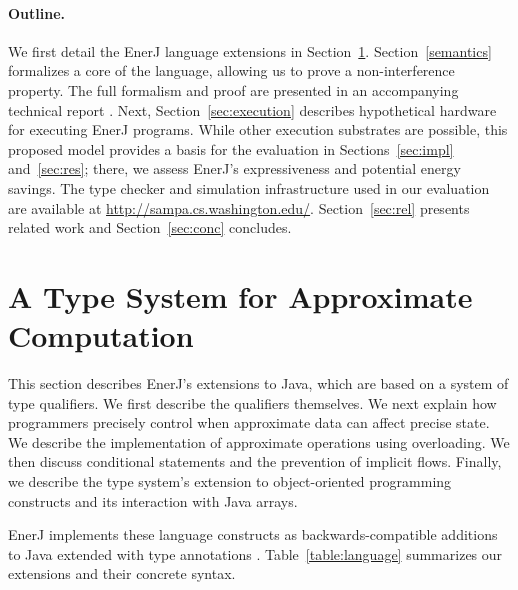 \paragraph{Outline.}
We first detail the EnerJ language extensions in
Section~\ref{sec:typesys}. Section~\ref{semantics} formalizes a core of the
language, allowing us to prove a non-interference property. The full
formalism and proof are
presented in an accompanying technical report \cite{EnerJ-TR}.
Next,
Section~\ref{sec:execution} describes hypothetical hardware for executing
EnerJ programs.
While other execution substrates are possible,
this proposed model provides a basis for the evaluation in
Sections~\ref{sec:impl} and~\ref{sec:res}; there, we assess
EnerJ's expressiveness and potential energy savings.
The type checker and simulation infrastructure used in our evaluation are
available at \url{http://sampa.cs.washington.edu/}.
Section~\ref{sec:rel} presents related work and
Section~\ref{sec:conc} concludes.



\section{A Type System for Approximate Computation}
\label{sec:typesys}

This section describes EnerJ's extensions to Java, which
are based on a system of type qualifiers. We first describe the
qualifiers themselves. We next explain how programmers precisely
control when approximate data can affect
precise state. We describe the implementation of approximate
operations using overloading. We then discuss
conditional statements and the prevention of implicit flows.
Finally, we describe the type system's extension to
object-oriented programming constructs and its interaction with
Java arrays.


EnerJ implements these language constructs as backwards-compatible
additions to Java extended with type
annotations \cite{jsr308}.
Table~\ref{table:language} summarizes our extensions and their
concrete syntax. %

